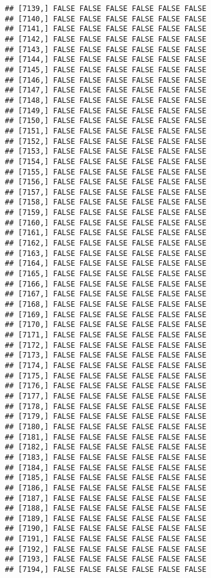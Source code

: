 \documentclass[
]{article}
\begin{document}
\begin{verbatim}
## [7139,] FALSE FALSE FALSE FALSE FALSE FALSE
## [7140,] FALSE FALSE FALSE FALSE FALSE FALSE
## [7141,] FALSE FALSE FALSE FALSE FALSE FALSE
## [7142,] FALSE FALSE FALSE FALSE FALSE FALSE
## [7143,] FALSE FALSE FALSE FALSE FALSE FALSE
## [7144,] FALSE FALSE FALSE FALSE FALSE FALSE
## [7145,] FALSE FALSE FALSE FALSE FALSE FALSE
## [7146,] FALSE FALSE FALSE FALSE FALSE FALSE
## [7147,] FALSE FALSE FALSE FALSE FALSE FALSE
## [7148,] FALSE FALSE FALSE FALSE FALSE FALSE
## [7149,] FALSE FALSE FALSE FALSE FALSE FALSE
## [7150,] FALSE FALSE FALSE FALSE FALSE FALSE
## [7151,] FALSE FALSE FALSE FALSE FALSE FALSE
## [7152,] FALSE FALSE FALSE FALSE FALSE FALSE
## [7153,] FALSE FALSE FALSE FALSE FALSE FALSE
## [7154,] FALSE FALSE FALSE FALSE FALSE FALSE
## [7155,] FALSE FALSE FALSE FALSE FALSE FALSE
## [7156,] FALSE FALSE FALSE FALSE FALSE FALSE
## [7157,] FALSE FALSE FALSE FALSE FALSE FALSE
## [7158,] FALSE FALSE FALSE FALSE FALSE FALSE
## [7159,] FALSE FALSE FALSE FALSE FALSE FALSE
## [7160,] FALSE FALSE FALSE FALSE FALSE FALSE
## [7161,] FALSE FALSE FALSE FALSE FALSE FALSE
## [7162,] FALSE FALSE FALSE FALSE FALSE FALSE
## [7163,] FALSE FALSE FALSE FALSE FALSE FALSE
## [7164,] FALSE FALSE FALSE FALSE FALSE FALSE
## [7165,] FALSE FALSE FALSE FALSE FALSE FALSE
## [7166,] FALSE FALSE FALSE FALSE FALSE FALSE
## [7167,] FALSE FALSE FALSE FALSE FALSE FALSE
## [7168,] FALSE FALSE FALSE FALSE FALSE FALSE
## [7169,] FALSE FALSE FALSE FALSE FALSE FALSE
## [7170,] FALSE FALSE FALSE FALSE FALSE FALSE
## [7171,] FALSE FALSE FALSE FALSE FALSE FALSE
## [7172,] FALSE FALSE FALSE FALSE FALSE FALSE
## [7173,] FALSE FALSE FALSE FALSE FALSE FALSE
## [7174,] FALSE FALSE FALSE FALSE FALSE FALSE
## [7175,] FALSE FALSE FALSE FALSE FALSE FALSE
## [7176,] FALSE FALSE FALSE FALSE FALSE FALSE
## [7177,] FALSE FALSE FALSE FALSE FALSE FALSE
## [7178,] FALSE FALSE FALSE FALSE FALSE FALSE
## [7179,] FALSE FALSE FALSE FALSE FALSE FALSE
## [7180,] FALSE FALSE FALSE FALSE FALSE FALSE
## [7181,] FALSE FALSE FALSE FALSE FALSE FALSE
## [7182,] FALSE FALSE FALSE FALSE FALSE FALSE
## [7183,] FALSE FALSE FALSE FALSE FALSE FALSE
## [7184,] FALSE FALSE FALSE FALSE FALSE FALSE
## [7185,] FALSE FALSE FALSE FALSE FALSE FALSE
## [7186,] FALSE FALSE FALSE FALSE FALSE FALSE
## [7187,] FALSE FALSE FALSE FALSE FALSE FALSE
## [7188,] FALSE FALSE FALSE FALSE FALSE FALSE
## [7189,] FALSE FALSE FALSE FALSE FALSE FALSE
## [7190,] FALSE FALSE FALSE FALSE FALSE FALSE
## [7191,] FALSE FALSE FALSE FALSE FALSE FALSE
## [7192,] FALSE FALSE FALSE FALSE FALSE FALSE
## [7193,] FALSE FALSE FALSE FALSE FALSE FALSE
## [7194,] FALSE FALSE FALSE FALSE FALSE FALSE

\end{verbatim}
\end{document}
